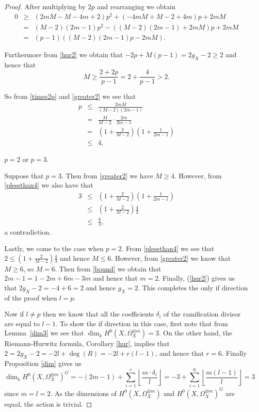 \begin{proof}
	After multiplying by $2p$ and rearranging we obtain
		\begin{eqnarray}\label{times2p}
			0 & \geq & (2mM-M-4m+2)p^2+(-4mM+M-2+4m)p+2mM \nonumber \\
			& = & (M-2)(2m-1)p^2-((M-2)(2m-1)+2mM)p+2mM \nonumber \\
			& = & (p-1)((M-2)(2m-1)p-2mM).
	\end{eqnarray}

	Furthermore from \eqref{hur2} we obtain that $-2p+M(p-1)=2g_X-2 \geq 2$ and hence that 
		\begin{equation}\label{greater2}
			M\geq \frac{2+2p}{p-1}=2+\frac{4}{p-1}>2.
		\end{equation}

	So from \eqref{times2p} and \eqref{greater2} we see that
		\begin{eqnarray}\label{plessthan4}
			p & \leq & \frac{2mM}{(M-2)(2m-1)}\nonumber\\
			& = & \frac{M}{M-2}\cdot\frac{2m}{2m-1}\nonumber\\
			& = & \left( 1+\frac{2}{M-2} \right) \left(1+\frac{1}{2m-1} \right)\\
			& \leq & 4, \nonumber	
		\end{eqnarray}

	\ie $p=2$ or $p=3$. 

	Suppose that $p=3$. Then from \eqref{greater2} we have $M\geq 4$. However, from  \eqref{plessthan4} we also have that 
		\begin{eqnarray*}
			3 & \leq &\left( 1+\frac{2}{M-2} \right) \left(1+\frac{1}{2m-1} \right)\\
			& \leq & \left( 1+\frac{2}{M-2} \right) \frac{4}{3}\\
			& \leq & \frac{8}{3},
		\end{eqnarray*}
	a contradiction.

	Lastly, we come to the case when $p=2$. From \eqref{plessthan4} we see that $2\leq \left(1+\frac{2}{M-2}\right)\frac{4}{3}$ 
	and hence $M\leq 6$. However, from \eqref{greater2} we know that $M\geq 6$, so $M=6$. Then from \eqref{bound}  we obtain that $2m-1=1-2m+6m-3m$
	and hence that $m=2$. Finally, (\ref{hur2}) gives us that $2g_X-2=-4+6=2$ and hence $g_X=2$. 
	This completes the only if direction of the proof when $l=p$.

    Now if $l\neq p$ then we know that all the coefficients $\delta_i$ of the ramification divisor are equal to $l-1$. 
    To show the if direction in this case, first note that from Lemma~\ref{dim3} we see that $\dim_kH^0(X,\Omega_X^{\otimes m})=3$. 
    On the other hand, the Riemann-Hurwitz formula, Corollary \ref{hur}, implies that $2 = 2g_X-2=-2l+\deg(R)=-2l+r(l-1)$, and hence that $r=6$. 
    Finally Proposition \ref{dim} gives us
      \begin{equation*}
	\dim_kH^0(X,\Omega_X^{\otimes m})^G = -(2m-1) + \sum_{i=1}^r \left\lfloor \frac{m\cdot \delta_i}{l} \right\rfloor
	= -3 +\sum_{i=1}^6 \left\lfloor \frac{m(l-1)}{l} \right\rfloor
	= 3
      \end{equation*}
    since $m=l=2$.
    As the dimensions of $H^0(X,\Omega_X^{\otimes m})$ and $H^0(X,\Omega_X^{\otimes m})^G$ are equal, the action is trivial.



\end{proof}
